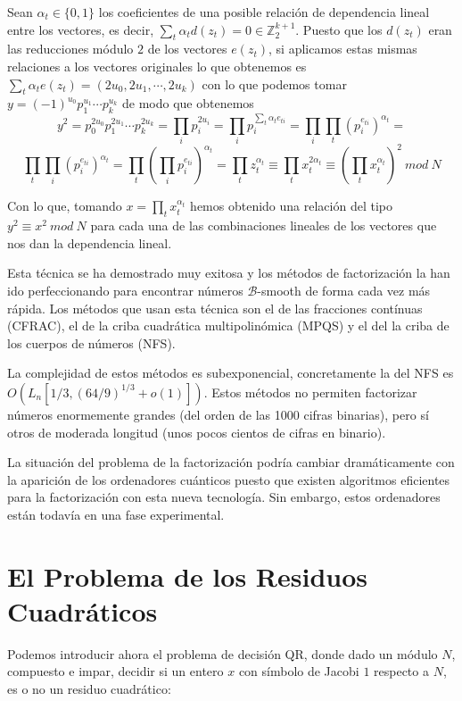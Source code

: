 Sean $\alpha_t \in \{0,1\}$ los coeficientes de una posible relaci\'on de dependencia lineal entre los
vectores, es decir, $\sum_{t} \alpha_t d(z_t) = 0 \in {\mathbb Z}_2^{k+1}$. Puesto que los $d(z_t)$ eran las reducciones m\'odulo $2$ de los vectores $e(z_t)$, si
aplicamos estas mismas relaciones a los vectores originales lo que obtenemos es $\sum_t \alpha_t e(z_t) = (2u_0, 2u_1, \cdots, 2u_k)$ con lo que podemos
tomar $y= (-1)^{u_0} p_1 ^ {u_1} \cdots p_k^{u_k}$ de modo que obtenemos
\[
y^2 =  p_0^{2u_0} p_1 ^ {2u_1} \cdots p_k^{2u_k} = \prod_{i} p_i^{2u_i} = \prod_i p_i^{\sum_t \alpha_t e_{ti}} =
\prod_i \prod_t \left(p_i^{e_{ti}}\right)^{\alpha_t} = \] \[\prod_t \prod_i \left(p_i^{e_{ti}}\right)^{\alpha_t} = \prod_t \left(\prod_i p_i^{e_{ti}}\right)^{\alpha_t} = \prod_t z_t^{\alpha_t} \equiv
\prod_t x_t^{2\alpha_t} \equiv \left( \prod_t x_t^{\alpha_t}\right)^2~mod~N
\]

Con lo que, tomando $x = \prod_t x_t^{\alpha_t}$ hemos obtenido una relaci\'on del tipo $y^2 \equiv x^2~mod~N$ para cada una de las combinaciones lineales de los
vectores que nos dan la dependencia lineal.

Esta t\'ecnica se ha demostrado muy exitosa y los m\'etodos de factorizaci\'on la han ido perfeccionando para encontrar n\'umeros ${\mathcal B}$-smooth de forma cada
vez m\'as r\'apida. Los m\'etodos que usan esta t\'ecnica son el de las fracciones cont\'inuas (CFRAC), el de la criba cuadr\'atica multipolin\'omica (MPQS) y el del
la criba de los cuerpos de n\'umeros (NFS).

La complejidad de estos m\'etodos es subexponencial, concretamente la del NFS es $O(L_n[1/3,(64/9)^{1/3} + o(1)])$. Estos m\'etodos no permiten factorizar n\'umeros
enormemente grandes (del orden de las 1000 cifras binarias), pero s\'i otros de moderada longitud (unos pocos cientos de cifras en binario).

La situaci\'on del problema de la factorizaci\'on podr\'ia cambiar dram\'aticamente con la aparici\'on de los ordenadores cu\'anticos puesto que existen algoritmos
eficientes para la factorizaci\'on con esta nueva tecnolog\'ia. Sin embargo, estos ordenadores est\'an todav\'ia en una fase experimental.


\section{El Problema de los Residuos Cuadr\'aticos}

Podemos introducir ahora  el problema de decisión QR, donde dado un módulo $N$,
compuesto e impar, decidir si un entero $x$ con símbolo de Jacobi $1$ respecto
a $N$, es o no un residuo cuadrático:

